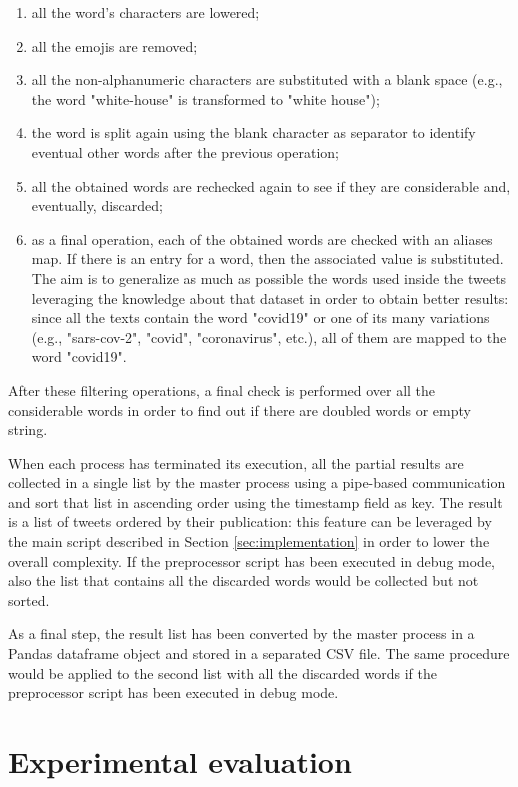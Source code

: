 \begin{description}
	\begin{enumerate}
		\item all the word's characters are lowered;
		\item all the emojis are removed;
		\item all the non-alphanumeric characters are substituted with a blank space (e.g., the word "white-house" is transformed to "white house");
		\item the word is split again using the blank character as separator to identify eventual other words after the previous operation;
		\item all the obtained words are rechecked again to see if they are considerable and, eventually, discarded;
		\item as a final operation, each of the obtained words are checked with an aliases map. If there is an entry for a word, then the associated value is substituted. The aim is to generalize as much as possible the words used inside the tweets leveraging the knowledge about that dataset in order to obtain better results: since all the texts contain the word "covid19" or one of its many variations (e.g., "sars-cov-2", "covid", "coronavirus", etc.), all of them are mapped to the word "covid19".
	\end{enumerate}
	After these filtering operations, a final check is performed over all the considerable words in order to find out if there are doubled words or empty string. 
\end{description}

When each process has terminated its execution, all the partial results are collected in a single list by the master process using a pipe-based communication and sort that list in ascending order using the timestamp field as key. The result is a list of tweets ordered by their publication: this feature can be leveraged by the main script described in Section \ref{sec:implementation} in order to lower the overall complexity. If the preprocessor script has been executed in debug mode, also the list that contains all the discarded words would be collected but not sorted.

As a final step, the result list has been converted by the master process in a Pandas \cite{python-pandas} dataframe object and stored in a separated CSV file. The same procedure would be applied to the second list with all the discarded words if the preprocessor script has been executed in debug mode.

\section{Experimental evaluation}
\label{sec:experimental_evaluation}

